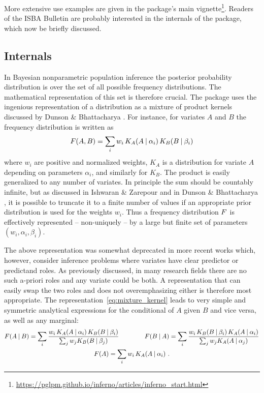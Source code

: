 More extensive use examples are given in the package's main vignette\footnote{\url{https://pglpm.github.io/inferno/articles/inferno_start.html}}. Readers of the ISBA Bulletin are probably interested in the internals of the package, which now be briefly discussed.


\subsection*{Internals}
\label{sec:representation}

In Bayesian nonparametric population inference the posterior probability distribution is over the set of all possible frequency distributions. The mathematical representation of this set is therefore crucial. The package uses the ingenious representation of a distribution as a mixture of product kernels discussed by Dunson \& Bhattacharya \citeyear{dunsonetal2011}. For instance, for variates $A$ and $B$ the frequency distribution is written as
\begin{equation}
  \label{eq:mixture_kernel}
  \yF(A, B) = \sum_{i} w_{i}\, K_{A}(A \| \alpha_{i})\, K_{B}(B \| \beta_{i})
\end{equation}
where $w_{i}$ are positive and normalized weights, $K_{A}$ is a distribution for variate $A$ depending on parameters $\alpha_{i}$, and similarly for $K_{B}$. The product is easily generalized to any number of variates. In principle the sum should be countably infinite, but as discussed in Ishwaran \& Zarepour \citeyear{ishwaranetal2002b,ishwaranetal2002c} and in Dunson \& Bhattacharya \citeyear{dunsonetal2011}, it is possible to truncate it to a finite number of values if an appropriate prior distribution is used for the weights $w_{i}$. Thus a frequency distribution $F$ is effectively represented -- non-uniquely -- by a large but finite set of parameters $(w_{i}, \alpha_{i}, \beta_{i})$.

The above representation was somewhat deprecated in more recent works \citep[e.g.][]{wadeetal2014,wadeetal2014b} which, however, consider inference problems where variates have clear predictor or predictand roles. As previously discussed, in many research fields there are no such a-priori roles and any variate could be both. A representation that can easily swap the two roles and does not overemphasizing either is therefore most appropriate. The representation~\eqref{eq:mixture_kernel} leads to very simple and symmetric analytical expressions for the conditional of $A$ given $B$ and vice versa, as well as any marginal:
\begin{equation*}
  \begin{gathered}
    \yF(A \| B) = \sum_{i}
    \frac{w_{i}\, K_{A}(A \| \alpha_{i})\, K_{B}(B \| \beta_{i})}{\sum_{j} w_{j}K_{B}(B \| \beta_{j})}
\qquad\qquad    \yF(B \| A) = \sum_{i}
    \frac{w_{i}\, K_{B}(B \| \beta_{i})\, K_{A}(A \| \alpha_{i})}{\sum_{j} w_{j}K_{A}(A \| \alpha_{j})}
    \\
    \yF(A) = \sum_{i}
    w_{i}\, K_{A}(A \| \alpha_{i}) \ .
  \end{gathered}
\end{equation*}

